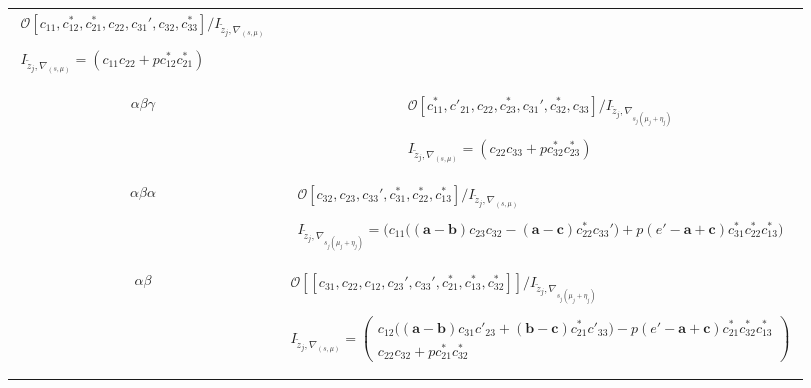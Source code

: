 \documentclass[oneside,a4paper,english, 11pt]{amsart}
\theoremstyle{plain}
\theoremstyle{plain}
\theoremstyle{plain}
\theoremstyle{plain}
\theoremstyle{plain}
\theoremstyle{plain}
\theoremstyle{definition}
\theoremstyle{definition}
\theoremstyle{definition}
\theoremstyle{remark}
\numberwithin{equation}{section}
\newcommand{\cO}{\mathcal{O}}
\newcommand{\tld}[1]{\widetilde{#1}}
\begin{document}
\begin{table}[H]
{\begin{tabular}{| c | c |}
$\begin{matrix}
\cO[c_{11},c_{12}^*,c_{21}^*,c_{22},c_{31}',c_{32},c_{33}^* ]/I_{\tld{z}_j,\nabla_{(s,\mu)}}
\\
\\
I_{\tld{z}_j,\nabla_{(s,\mu)}}=(c_{11} c_{22} +p c_{12}^* c_{21}^*)
 \end{matrix}$
 \\
&  \\
\hline
&  \\
$\alpha \beta \gamma$ &   $\begin{matrix} \cO[c_{11}^*,c'_{21}, c_{22}, c_{23}^*,c_{31}',c_{32}^*,c_{33}]/I_{\tld{z}_j,\nabla_{s_j(\mu_j+\eta_j)}} 
 \\ \\I_{\tld{z}_j,\nabla_{(s,\mu)}}=(c_{22} c_{33} + p c_{32}^* c_{23}^*) \end{matrix} $
 \\
&  \\
\hline \hline
&  \\
$\alpha \beta \alpha$ &$\begin{matrix}\cO[c_{32}, c_{23}, c_{33}', c_{31}^*, c_{22}^*, c_{13}^*] /I_{\tld{z}_j,\nabla_{(s,\mu)}} 
 \\ \\I_{\tld{z}_j,\nabla_{s_j(\mu_j+\eta_j)}}=\Big(c_{11}\Big((\mathbf{a}-\mathbf{b})c_{23}c_{32}-(\mathbf{a}-\mathbf{c})c_{22}^*c_{33}'\Big)+p(e'-\mathbf{a}+\mathbf{c})c_{31}^*c_{22}^*c_{13}^*\Big)
\end{matrix} 
$
\\
& \\
\hline \hline
& \\
$\alpha \beta$&$\begin{matrix}\cO[\![c_{31}, c_{22}, c_{12}, c_{23}', c_{33}', c_{21}^*, c_{13}^*, c_{32}^*]\!] /I_{\tld{z}_j,\nabla_{s_j(\mu_j+\eta_j)}} 
 \\ \\I_{\tld{z}_j,\nabla_{(s,\mu)}}=\left(\begin{array}{l}c_{12}\Big((\mathbf{a}-\mathbf{b})c_{31}c'_{23}+(\mathbf{b}-\mathbf{c})c^*_{21}c'_{33}\Big)-p(e'-\mathbf{a}+\mathbf{c})c^*_{21}c^*_{32}c^*_{13}\\
 c_{22}c_{32}+pc_{21}^*c_{32}^*
 \end{array}\right)
\end{matrix} $\\
&\\
\hline
\hline
& \\


\end{tabular}}
\end{table}
\end{document}
